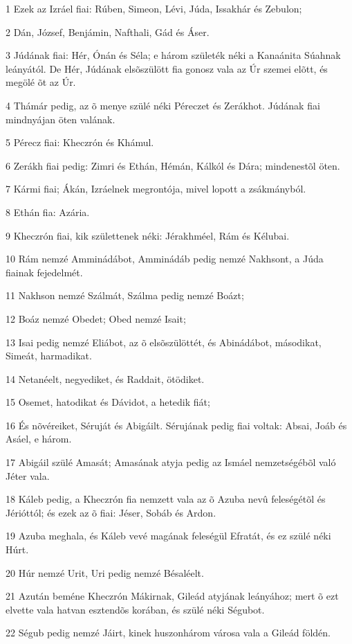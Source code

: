 \par 1 Ezek az Izráel fiai: Rúben, Simeon, Lévi, Júda, Issakhár és Zebulon;
\par 2 Dán, József, Benjámin, Nafthali, Gád és Áser.
\par 3 Júdának fiai: Hér, Ónán és Séla; e három születék néki a Kanaánita Súahnak leányától. De Hér, Júdának elsõszülött fia gonosz vala az Úr szemei elõtt, és megölé õt az Úr.
\par 4 Thámár pedig, az õ menye szülé néki Péreczet és Zerákhot. Júdának fiai mindnyájan öten valának.
\par 5 Pérecz fiai: Kheczrón és Khámul.
\par 6 Zerákh fiai pedig: Zimri és Ethán, Hémán, Kálkól és Dára; mindenestõl öten.
\par 7 Kármi fiai; Ákán, Izráelnek megrontója, mivel lopott a zsákmányból.
\par 8 Ethán fia: Azária.
\par 9 Kheczrón fiai, kik születtenek néki: Jérakhméel, Rám és Kélubai.
\par 10 Rám nemzé Amminádábot, Amminádáb pedig nemzé Nakhsont, a Júda fiainak fejedelmét.
\par 11 Nakhson nemzé Szálmát, Szálma pedig nemzé Boázt;
\par 12 Boáz nemzé Obedet; Obed nemzé Isait;
\par 13 Isai pedig nemzé Eliábot, az õ elsõszülöttét, és Abinádábot, másodikat, Simeát,  harmadikat.
\par 14 Netanéelt, negyediket, és Raddait, ötödiket.
\par 15 Osemet, hatodikat és Dávidot, a hetedik fiát;
\par 16 És nõvéreiket, Séruját és Abigáilt. Sérujának pedig fiai voltak: Absai, Joáb  és Asáel, e három.
\par 17 Abigáil szülé Amasát; Amasának atyja pedig az Ismáel nemzetségébõl való Jéter vala.
\par 18 Káleb pedig, a Kheczrón fia nemzett vala az õ Azuba nevû feleségétõl és Jérióttól; és ezek az õ fiai: Jéser, Sobáb és Ardon.
\par 19 Azuba meghala, és Káleb vevé magának feleségül Efratát, és ez szülé néki Húrt.
\par 20 Húr nemzé Urit, Uri pedig nemzé Bésaléelt.
\par 21 Azután beméne Kheczrón Mákirnak, Gileád atyjának leányához; mert õ ezt elvette vala hatvan esztendõs korában, és szülé néki Ségubot.
\par 22 Ségub pedig nemzé Jáirt, kinek huszonhárom városa vala a Gileád földén.
